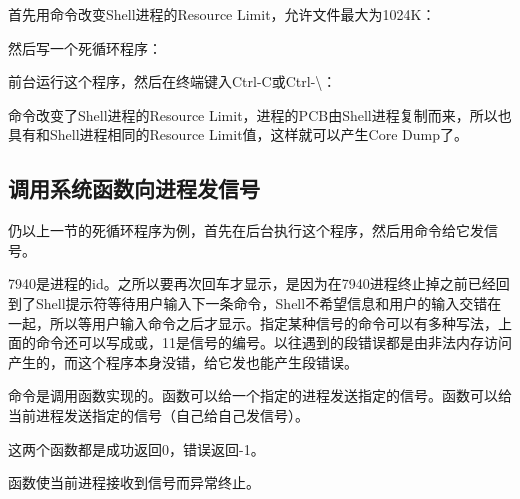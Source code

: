 首先用命令改变Shell进程的Resource Limit，允许文件最大为1024K：




然后写一个死循环程序：




前台运行这个程序，然后在终端键入Ctrl-C或Ctrl-\textbackslash{}：




命令改变了Shell进程的Resource Limit，进程的PCB由Shell进程复制而来，所以也具有和Shell进程相同的Resource Limit值，这样就可以产生Core Dump了。


\subsection{调用系统函数向进程发信号}
%


仍以上一节的死循环程序为例，首先在后台执行这个程序，然后用命令给它发信号。




7940是进程的id。之所以要再次回车才显示，是因为在7940进程终止掉之前已经回到了Shell提示符等待用户输入下一条命令，Shell不希望信息和用户的输入交错在一起，所以等用户输入命令之后才显示。指定某种信号的命令可以有多种写法，上面的命令还可以写成或，11是信号的编号。以往遇到的段错误都是由非法内存访问产生的，而这个程序本身没错，给它发也能产生段错误。



命令是调用函数实现的。函数可以给一个指定的进程发送指定的信号。函数可以给当前进程发送指定的信号（自己给自己发信号）。




这两个函数都是成功返回0，错误返回-1。



函数使当前进程接收到信号而异常终止。




